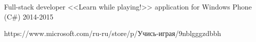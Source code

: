 \begin{cventries}

\cventry
{Full-stack developer} %
{<<Learn while playing!>> application for Windows Phone  (C\#) } %
{} %
{2014-2015} %
{ %
 \begin{cvitems}
\item {https://www.microsoft.com/ru-ru/store/p/Учись-играя/9nblgggzdbbh}
 \end{cvitems}
}

\end{cventries}
